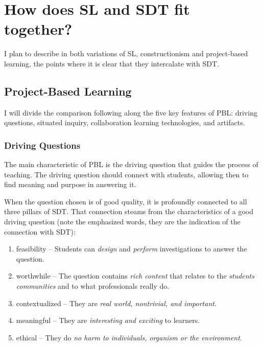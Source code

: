 \section{How does SL and SDT fit together?}

I plan to describe in both variations of SL, constructionism and project-based learning,
the points where it is clear that they intercalate with SDT. 

\subsection{Project-Based Learning}

I will divide the comparison following along the five key features of PBL:
driving questions, situated inquiry, collaboration learning technologies, and
artifacts.\cite{education:joseph_phyllis__pbl}

\subsubsection{Driving Questions}

The main characteristic of PBL is the driving question that guides the process
of teaching. The driving question should connect with students, allowing then to
find meaning and purpose in answering it.

When the question chosen is of good quality, it is profoundly connected to
all three pillars of SDT. That connection steams from the characteristics of a
good driving question (note the emphasized words, they are the indication of the
connection with SDT):\cite{education:joseph_phyllis__pbl}

\begin{enumerate}
\item feasibility -- Students can \emph{design} and \emph{perform}
investigations to answer the question.

\item worthwhile -- The question contains \emph{rich content} that relates to
the \emph{students communities} and to what professionals really do.

\item contextualized -- They are \emph{real world, nontrivial, and important}.

\item meaningful -- They are \emph{interesting and exciting} to learners.

\item ethical -- They do \emph{no harm to individuals, organism or the
environment}.
\end{enumerate}


